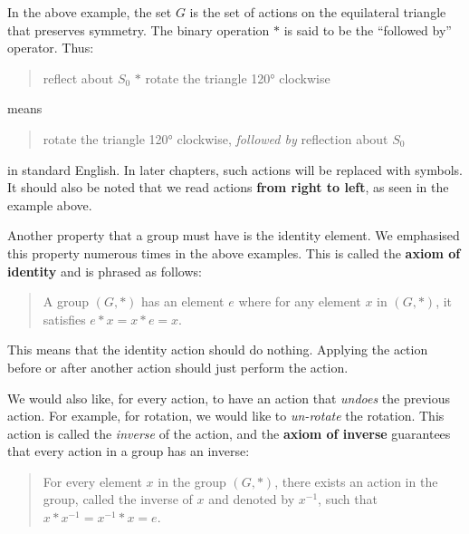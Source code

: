 In the above example, the set $G$ is the set of actions on the equilateral triangle that preserves symmetry. The binary operation $\ast$ is said to be the ``followed by'' operator. Thus:
\begin{quote}
    reflect about $S_0$ $\ast$ rotate the triangle 120° clockwise
\end{quote}
means
\begin{quote}
    rotate the triangle 120° clockwise, \textit{followed by} reflection about $S_0$
\end{quote}
in standard English. In later chapters, such actions will be replaced with symbols. It should also be noted that we read actions \textbf{from right to left}, as seen in the example above.

Another property that a group must have is the identity element. We emphasised this property numerous times in the above examples. This is called the \textbf{axiom of identity} and is phrased as follows:
\begin{quote}
    A group $(G, \ast)$ has an element $e$ where for any element $x$ in $(G, \ast)$, it satisfies $e \ast x = x \ast e = x$.
\end{quote}
This means that the identity action should do nothing. Applying the action before or after another action should just perform the action.

We would also like, for every action, to have an action that \textit{undoes} the previous action. For example, for rotation, we would like to \textit{un-rotate} the rotation. This action is called the \textit{inverse} of the action, and the \textbf{axiom of inverse} guarantees that every action in a group has an inverse:
\begin{quote}
    For every element $x$ in the group $(G, \ast)$, there exists an action in the group, called the inverse of $x$ and denoted by $x^{-1}$, such that $x \ast x^{-1} = x^{-1} \ast x = e$.
\end{quote}

\newpage

\begin{figure}
    \centering
\end{figure}

